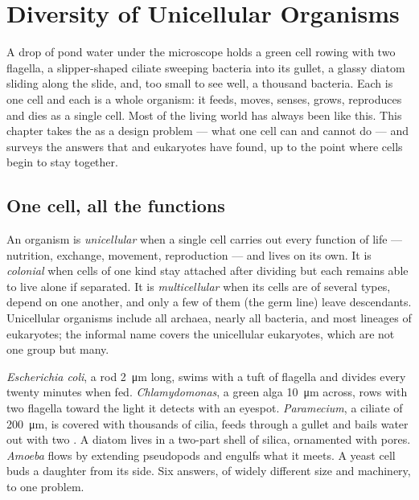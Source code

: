 \chapter{Diversity of Unicellular Organisms}\label{ch:b2:unicellular-diversity}

A drop of pond water under the microscope holds a green cell rowing
with two flagella, a slipper-shaped ciliate sweeping bacteria into its
gullet, a glassy diatom sliding along the slide, and, too small to
see well, a thousand bacteria. Each is one cell and each is a whole
organism: it feeds, moves, senses, grows, reproduces and dies as a
single cell. Most of the living world has always been like this. This
chapter takes the  as a design problem --- what
one cell can and cannot do --- and surveys the answers that
 and eukaryotes have found, up to the point where cells
begin to stay together.

\section{One cell, all the functions}

\begin{definition}\label{def:b2:unicellular-diversity:unicellular}
An organism is \emph{unicellular} when a
single cell carries out every function of life --- nutrition,
exchange, movement, reproduction --- and lives on its own. It is
\emph{colonial} when cells of one kind stay
attached after dividing but each remains able to live alone if
separated. It is \emph{multicellular}
when its cells are of several types, depend on one another, and only
a few of them (the germ line) leave descendants. Unicellular
organisms include all archaea, nearly all bacteria, and most
lineages of eukaryotes; the informal name \emph{} covers the
unicellular eukaryotes, which are not one group but many.
\end{definition}

\begin{example}\label{ex:b2:unicellular-diversity:drop}
\emph{Escherichia coli}, a rod \qty{2}{\micro m} long, swims with a
tuft of flagella and divides every twenty minutes when fed.
\emph{Chlamydomonas}, a green alga \qty{10}{\micro m} across, rows
with two flagella toward the light it detects with an eyespot.
\emph{Paramecium}, a ciliate of \qty{200}{\micro m}, is covered with
thousands of cilia, feeds through a gullet and bails water out with
two . A diatom lives in a two-part shell of
silica, ornamented with pores. \emph{Amoeba} flows by extending
pseudopods and engulfs what it meets. A yeast cell buds a daughter
from its side. Six answers, of widely different size and machinery,
to one problem.
\end{example}

